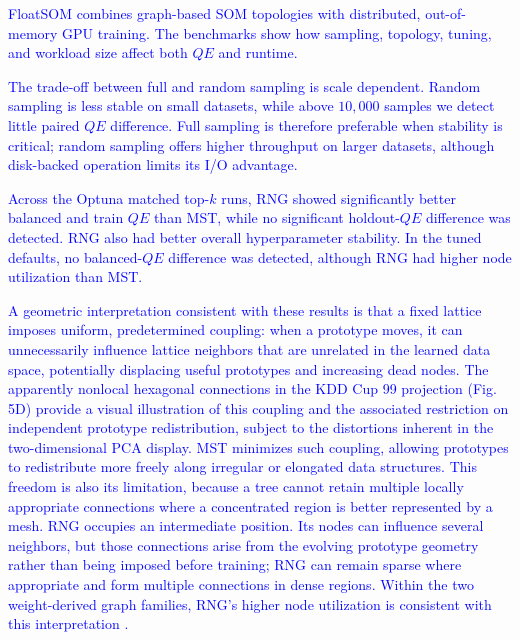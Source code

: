 \documentclass[10pt]{article} %
\newcommand{\TrackedChange}[1]{\textcolor{blue}{#1}}
\begin{document}
\TrackedChange{FloatSOM combines graph-based SOM topologies with distributed, out-of-memory GPU training.} \TrackedChange{The benchmarks show how sampling, topology, tuning, and workload size affect both $QE$ and runtime.}

\TrackedChange{The trade-off between full and random sampling is scale dependent.} \TrackedChange{Random sampling is less stable on small datasets, while above $10{,}000$ samples we detect little paired $QE$ difference.} \TrackedChange{Full sampling is therefore preferable when stability is critical; random sampling offers higher throughput on larger datasets, although disk-backed operation limits its I/O advantage.}

\TrackedChange{Across the Optuna matched top-$k$ runs, RNG showed significantly better balanced and train $QE$ than MST, while no significant holdout-$QE$ difference was detected.} \TrackedChange{RNG also had better overall hyperparameter stability.} \TrackedChange{In the tuned defaults, no balanced-$QE$ difference was detected, although RNG had higher node utilization than MST.}

\TrackedChange{A geometric interpretation consistent with these results is that a fixed lattice imposes uniform, predetermined coupling: when a prototype moves, it can unnecessarily influence lattice neighbors that are unrelated in the learned data space, potentially displacing useful prototypes and increasing dead nodes.} \TrackedChange{The apparently nonlocal hexagonal connections in the KDD Cup 99 projection (Fig. 5D) provide a visual illustration of this coupling and the associated restriction on independent prototype redistribution, subject to the distortions inherent in the two-dimensional PCA display.} \TrackedChange{MST minimizes such coupling, allowing prototypes to redistribute more freely along irregular or elongated data structures.} \TrackedChange{This freedom is also its limitation, because a tree cannot retain multiple locally appropriate connections where a concentrated region is better represented by a mesh.} \TrackedChange{RNG occupies an intermediate position.} \TrackedChange{Its nodes can influence several neighbors, but those connections arise from the evolving prototype geometry rather than being imposed before training; RNG can remain sparse where appropriate and form multiple connections in dense regions.} \TrackedChange{Within the two weight-derived graph families, RNG's higher node utilization is consistent with this interpretation \citep{kohonenEssentialsSelforganizingMap2013,kangasVariantsSelforganizingMaps1990,toussaintRelativeNeighbourhoodGraph1980}.}
\end{document}
